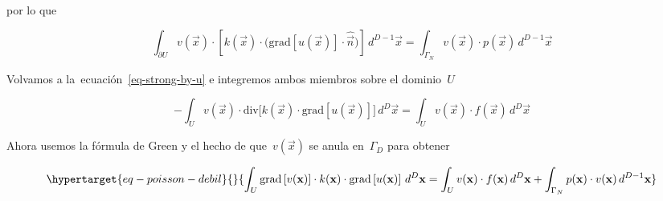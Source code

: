 \documentclass[
  12pt,
  a4paper,
  table]{scrbook}
\theoremstyle{plain}
\theoremstyle{definition}
\theoremstyle{plain}
\theoremstyle{plain}
\theoremstyle{remark}
\begin{document}
por lo que

\[
\int_{\partial U} v(\vec{x}) \cdot \left[ k(\vec{x}) \cdot \Big( \mathrm{grad}\left[ u(\vec{x}) \right] \cdot \hat{\vec{n}} \Big) \right] \, d^{D-1}\vec{x}
 =
\int_{\Gamma_N} v(\vec{x}) \cdot p(\vec{x}) \,d^{D-1}\vec{x}
\]

Volvamos a la~ecuación~\ref{eq-strong-by-u} e integremos ambos miembros
sobre el dominio~\(U\)

\[
-\int_U v(\vec{x}) \cdot \text{div} \Big[ k(\vec{x}) \cdot \text{grad} \left[ u(\vec{x}) \right] \Big]  \,d^D\vec{x}
=
\int_U v(\vec{x}) \cdot f(\vec{x}) \,d^D\vec{x}
\]

Ahora usemos la fórmula de Green y el hecho de que~\(v(\vec{x})\) se
anula en~\(\Gamma_D\) para obtener

\begin{equation}\protect\hypertarget{eq-poisson-debil}{}{
\int_U \text{grad} \left[ v(\vec{x}) \right] \cdot k(\vec{x}) \cdot \text{grad} \left[ u(\vec{x}) \right]  \,d^D\vec{x}
=
\int_U v(\vec{x}) \cdot f(\vec{x}) \,d^D\vec{x}
+ \int_{\Gamma_N} p(\vec{x}) \cdot v(\vec{x}) \,d^{D-1}\vec{x}
}\label{eq-poisson-debil}\end{equation}
\end{document}
